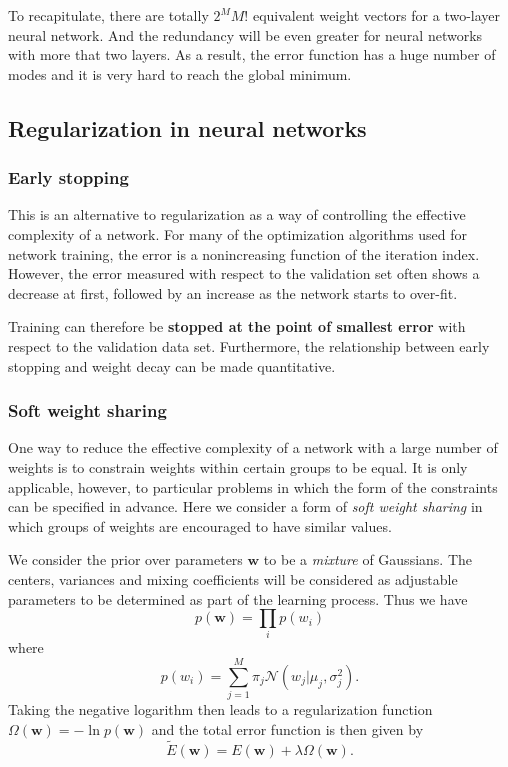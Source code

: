 \documentclass[a4paper]{book}
\renewcommand{\bf}{\mathbf}
\renewcommand{\cal}{\mathcal}
\newcommand{\imp}[1]{\textit{#1}}
\begin{document}
To recapitulate, there are totally $2^M M!$ equivalent weight vectors for a two-layer neural network. And the redundancy will be even greater for neural networks with more that two layers. As a result, the error function has a huge number of modes and it is very hard to reach the global minimum.
\subsection{Regularization in neural networks}
\subsubsection{Early stopping}
This is an alternative to regularization as a way of controlling the effective complexity of a network. For many of the optimization algorithms used for network training, the error is a nonincreasing function of the iteration index. However, the error measured with respect to the validation set often shows a decrease at first, followed by an increase as the network starts to over-fit.

Training can therefore be \textbf{stopped at the point of smallest error} with respect to the validation data set. Furthermore, the relationship between early stopping and weight decay can be made quantitative.

\subsubsection{Soft weight sharing}
One way to reduce the effective complexity of a network with a large number of weights is to constrain weights within certain groups to be equal. It is only applicable, however, to particular problems in which the form of the constraints can be specified in advance. Here we consider a form of \imp{soft weight sharing} in which groups of weights are encouraged to have similar values.

We consider the prior over parameters $\bf{w}$ to be a \imp{mixture} of Gaussians. The centers, variances and mixing coefficients will be considered as adjustable parameters to be determined as part of the learning process. Thus we have
\begin{equation}
	p(\bf{w}) = \prod_i p(w_i)
\end{equation}
where
\begin{equation}
	p(w_i) = \sum_{j=1}^M \pi_j \cal{N}(w_j|\mu_j,\sigma_j^2).
\end{equation}
Taking the negative logarithm then leads to a regularization function $\Omega(\bf{w}) = - \ln p(\bf{w})$ and the total error function is then given by
\begin{equation}
	\tilde{E}(\bf{w}) = E(\bf{w}) + \lambda \Omega(\bf{w}).
\end{equation}
\end{document}
